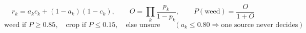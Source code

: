 \documentclass[varwidth=26cm,border=10pt]{standalone}
\begin{document}
\Large
$$r_k=a_k c_k+(1-a_k)(1-c_k),\qquad O=\prod_k\frac{p_k}{1-p_k},\qquad P(\text{weed})=\frac{O}{1+O}$$
$$\text{weed if }P\ge 0.85,\quad\text{crop if }P\le 0.15,\quad\text{else unsure}\qquad(a_k\le 0.80\Rightarrow\text{one source never decides})$$
\end{document}
